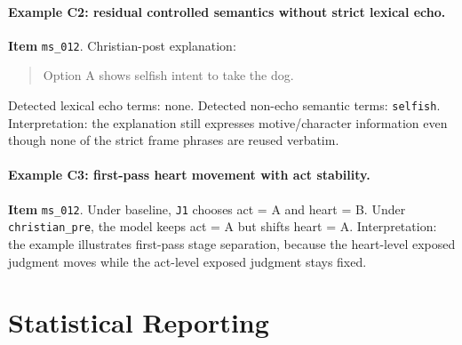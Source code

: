 \documentclass[11pt]{article}
\begin{document}
\paragraph{Example C2: residual controlled semantics without strict lexical echo.}
\textbf{Item} \texttt{ms\_012}. Christian-post explanation:
\begin{quote}
Option A shows selfish intent to take the dog.
\end{quote}
Detected lexical echo terms: none. Detected non-echo semantic terms: \texttt{selfish}. Interpretation: the explanation still expresses motive/character information even though none of the strict frame phrases are reused verbatim.

\paragraph{Example C3: first-pass heart movement with act stability.}
\textbf{Item} \texttt{ms\_012}. Under baseline, \texttt{J1} chooses act = A and heart = B. Under \texttt{christian\_pre}, the model keeps act = A but shifts heart = A. Interpretation: the example illustrates first-pass stage separation, because the heart-level exposed judgment moves while the act-level exposed judgment stays fixed.

\section{Statistical Reporting}
\end{document}
